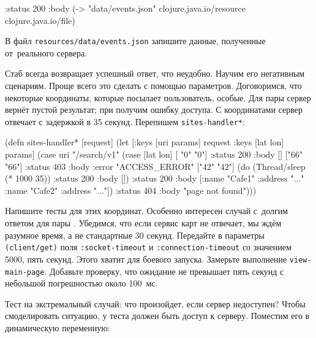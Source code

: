 
\begin{english}
  \begin{clojure}
{:status 200
 :body (-> "data/events.json"
           clojure.java.io/resource
           clojure.java.io/file)}
  \end{clojure}
\end{english}

\noindent
В файл \verb|resources/data/events.json| запишите данные, полученные
от~реального сервера.


Стаб всегда возвращает успешный ответ, что неудобно. Научим его негативным
сценариям. Проще всего это сделать с помощью параметров. Договоримся, что
некоторые координаты, которые посылает пользователь, особые. Для пары  сервер вернёт пустой результат; при  получим ошибку
доступа. С координатами  сервер отвечает с задержкой в 35
секунд. Перепишем \verb|sites-handler*|:

\begin{english}
  \begin{clojure}
(defn sites-handler* [request]
  (let [{:keys [uri params]} request
        {:keys [lat lon]} params]
    (case uri
      "/search/v1"
      (case [lat lon]
        [ "0"  "0"] {:status 200 :body []}
        ["66" "66"] {:status 403 :body {:error "ACCESS_ERROR"}}
        ["42" "42"] (do (Thread/sleep (* 1000 35))
                        {:status 200 :body []})
        {:status 200
         :body [{:name "Cafe1" :address "..."}
                {:name "Cafe2" :address "..."}]})
      {:status 404 :body "page not found"})))
  \end{clojure}
\end{english}


Напишите тесты для этих координат. Особенно интересен случай с~долгим ответом
для пары . Убедимся, что если сервис карт не отвечает, мы ждём
разумное время, а не стандартные 30 секунд. Передайте в параметры
\verb|(client/get)| поля \verb|:socket-timeout| и \verb|:connection-timeout| со
значением 5000, пять секунд. Этого хватит для боевого запуска. Замерьте
выполнение \verb|view-main-page|. Добавьте проверку, что ожидание не превышает
пять секунд с небольшой погрешностью около 100~мс.

Тест на экстремальный случай: что произойдет, если сервер недоступен? Чтобы
смоделировать ситуацию, у теста должен быть доступ к серверу. Поместим его в
динамическую переменную:

